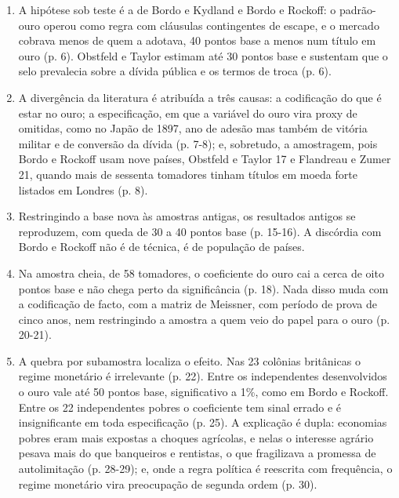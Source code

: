 \begin{enumerate}[leftmargin=*,nosep]
\item A hipótese sob teste é a de Bordo e Kydland e Bordo e Rockoff: o padrão-ouro
operou como regra com cláusulas contingentes de escape, e o mercado cobrava menos
de quem a adotava, 40 pontos base a menos num título em ouro (p. 6). Obstfeld e
Taylor estimam até 30 pontos base e sustentam que o selo prevalecia sobre a
dívida pública e os termos de troca (p. 6).
\item A divergência da literatura é atribuída a três causas: a codificação do que
é estar no ouro; a especificação, em que a variável do ouro vira proxy de
omitidas, como no Japão de 1897, ano de adesão mas também de vitória militar e de
conversão da dívida (p. 7-8); e, sobretudo, a amostragem, pois Bordo e Rockoff
usam nove países, Obstfeld e Taylor 17 e Flandreau e Zumer 21, quando mais de
sessenta tomadores tinham títulos em moeda forte listados em Londres (p. 8).
\item Restringindo a base nova às amostras antigas, os resultados antigos se
reproduzem, com queda de 30 a 40 pontos base (p. 15-16). A discórdia com Bordo e
Rockoff não é de técnica, é de população de países.
\item Na amostra cheia, de 58 tomadores, o coeficiente do ouro cai a cerca de oito
pontos base e não chega perto da significância (p. 18). Nada disso muda com a
codificação de facto, com a matriz de Meissner, com período de prova de cinco
anos, nem restringindo a amostra a quem veio do papel para o ouro (p. 20-21).
\item A quebra por subamostra localiza o efeito. Nas 23 colônias britânicas o
regime monetário é irrelevante (p. 22). Entre os independentes desenvolvidos o
ouro vale até 50 pontos base, significativo a 1\%, como em Bordo e Rockoff. Entre
os 22 independentes pobres o coeficiente tem sinal errado e é insignificante em
toda especificação (p. 25). A explicação é dupla: economias pobres eram mais
expostas a choques agrícolas, e nelas o interesse agrário pesava mais do que
banqueiros e rentistas, o que fragilizava a promessa de autolimitação (p. 28-29);
e, onde a regra política é reescrita com frequência, o regime monetário vira
preocupação de segunda ordem (p. 30).
\end{enumerate}


